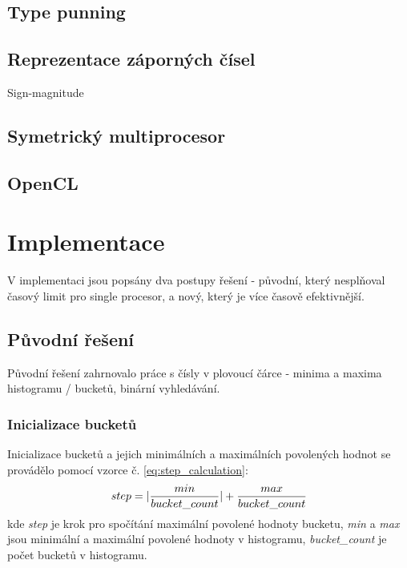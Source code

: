 \documentclass[12pt, a4paper]{article}
\begin{document}
\subsection{Type punning}
\subsection{Reprezentace záporných čísel}
Sign-magnitude
\subsection{Symetrický multiprocesor}
\subsection{OpenCL}

\newpage







\section{Implementace}
V implementaci jsou popsány dva postupy řešení - původní, který nesplňoval časový limit pro single procesor, a nový, který je více časově efektivnější.

\subsection{Původní řešení}
Původní řešení zahrnovalo práce s čísly v plovoucí čárce - minima a maxima histogramu / bucketů, binární vyhledávání.

\subsubsection{Inicializace bucketů}
Inicializace bucketů a jejich minimálních a maximálních povolených hodnot se provádělo pomocí vzorce č. \ref{eq:step_calculation}:
\begin{equation}
step = |\frac{min}{bucket\_count}| + \frac{max}{bucket\_count} \\
\label{eq:step_calculation} 
\end{equation}
kde \textit{step} je krok pro spočítání maximální povolené hodnoty bucketu, \textit{min} a \textit{max} jsou minimální a maximální povolené hodnoty v histogramu, \textit{bucket\_count} je počet bucketů v histogramu.
\end{document}

